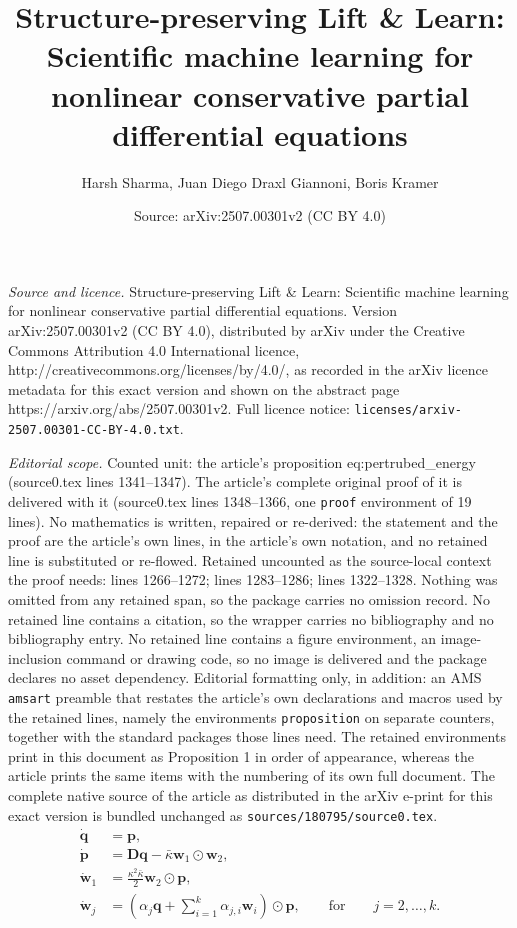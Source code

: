 \documentclass[10pt,a4paper]{amsart}
\title{Structure-preserving Lift \& Learn: Scientific machine learning for nonlinear conservative partial differential equations}
\author{Harsh Sharma, Juan Diego Draxl Giannoni, Boris Kramer}
\date{Source: arXiv:2507.00301v2 (CC BY 4.0)}
\newcommand{\D}{\mathbf D}
\newcommand{\p}{\mathbf p}
\newcommand{\q}{\mathbf q}
\newcommand{\w}{\mathbf w}
\begin{document}
\maketitle

\noindent\emph{Source and licence.} Structure-preserving Lift \& Learn: Scientific machine learning for nonlinear conservative partial differential equations. Version arXiv:2507.00301v2 (CC BY 4.0), distributed by arXiv under the Creative Commons Attribution 4.0 International licence, http://creativecommons.org/licenses/by/4.0/, as recorded in the arXiv licence metadata for this exact version and shown on the abstract page https://arxiv.org/abs/2507.00301v2. Full licence notice: \texttt{licenses/arxiv-2507.00301-CC-BY-4.0.txt}.\par\smallskip

\noindent\textit{Editorial scope.} Counted unit: the article's proposition eq:pertrubed\_energy (source0.tex lines 1341--1347). The article's complete original proof of it is delivered with it (source0.tex lines 1348--1366, one \texttt{proof} environment of 19 lines). No mathematics is written, repaired or re-derived: the statement and the proof are the article's own lines, in the article's own notation, and no retained line is substituted or re-flowed.  Retained uncounted as the source-local context the proof needs: lines 1266--1272; lines 1283--1286; lines 1322--1328.  Nothing was omitted from any retained span, so the package carries no omission record.  No retained line contains a citation, so the wrapper carries no bibliography and no bibliography entry.  No retained line contains a figure environment, an image-inclusion command or drawing code, so no image is delivered and the package declares no asset dependency.  Editorial formatting only, in addition: an AMS \texttt{amsart} preamble that restates the article's own declarations and macros used by the retained lines, namely the environments \texttt{proposition} on separate counters, together with the standard packages those lines need.  The retained environments print in this document as Proposition 1 in order of appearance, whereas the article prints the same items with the numbering of its own full document.  The complete native source of the article as distributed in the arXiv e-print for this exact version is bundled unchanged as \texttt{sources/180795/source0.tex}.
\begin{align}
\label{eq:gen_lift_fom}
    \dot{\q}&=\p, \nonumber\\
    \dot{\p}&=\D\q -\bar{\kappa} \w_1\odot \w_2,\nonumber \\
    \dot{\w}_1&=\frac{\kappa^2\bar{\kappa}}{2}\w_2 \odot \p, \\
    \dot{\w}_j&=\left(\alpha_j\q +\sum_{i=1}^{k}\alpha_{j,i}\w_i \right) \odot \p,  \qquad \text{for} \qquad j=2, \ldots,k. \nonumber 
    \end{align}
\end{document}
